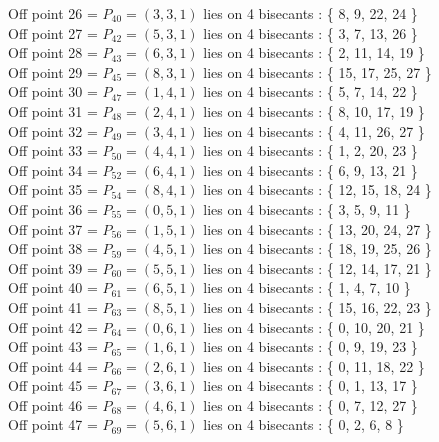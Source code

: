Off point 26 = $P_{40} = ( 3, 3, 1 )$ lies on 4 bisecants : \{ 8, 9, 22, 24 \}\\
Off point 27 = $P_{42} = ( 5, 3, 1 )$ lies on 4 bisecants : \{ 3, 7, 13, 26 \}\\
Off point 28 = $P_{43} = ( 6, 3, 1 )$ lies on 4 bisecants : \{ 2, 11, 14, 19 \}\\
Off point 29 = $P_{45} = ( 8, 3, 1 )$ lies on 4 bisecants : \{ 15, 17, 25, 27 \}\\
Off point 30 = $P_{47} = ( 1, 4, 1 )$ lies on 4 bisecants : \{ 5, 7, 14, 22 \}\\
Off point 31 = $P_{48} = ( 2, 4, 1 )$ lies on 4 bisecants : \{ 8, 10, 17, 19 \}\\
Off point 32 = $P_{49} = ( 3, 4, 1 )$ lies on 4 bisecants : \{ 4, 11, 26, 27 \}\\
Off point 33 = $P_{50} = ( 4, 4, 1 )$ lies on 4 bisecants : \{ 1, 2, 20, 23 \}\\
Off point 34 = $P_{52} = ( 6, 4, 1 )$ lies on 4 bisecants : \{ 6, 9, 13, 21 \}\\
Off point 35 = $P_{54} = ( 8, 4, 1 )$ lies on 4 bisecants : \{ 12, 15, 18, 24 \}\\
Off point 36 = $P_{55} = ( 0, 5, 1 )$ lies on 4 bisecants : \{ 3, 5, 9, 11 \}\\
Off point 37 = $P_{56} = ( 1, 5, 1 )$ lies on 4 bisecants : \{ 13, 20, 24, 27 \}\\
Off point 38 = $P_{59} = ( 4, 5, 1 )$ lies on 4 bisecants : \{ 18, 19, 25, 26 \}\\
Off point 39 = $P_{60} = ( 5, 5, 1 )$ lies on 4 bisecants : \{ 12, 14, 17, 21 \}\\
Off point 40 = $P_{61} = ( 6, 5, 1 )$ lies on 4 bisecants : \{ 1, 4, 7, 10 \}\\
Off point 41 = $P_{63} = ( 8, 5, 1 )$ lies on 4 bisecants : \{ 15, 16, 22, 23 \}\\
Off point 42 = $P_{64} = ( 0, 6, 1 )$ lies on 4 bisecants : \{ 0, 10, 20, 21 \}\\
Off point 43 = $P_{65} = ( 1, 6, 1 )$ lies on 4 bisecants : \{ 0, 9, 19, 23 \}\\
Off point 44 = $P_{66} = ( 2, 6, 1 )$ lies on 4 bisecants : \{ 0, 11, 18, 22 \}\\
Off point 45 = $P_{67} = ( 3, 6, 1 )$ lies on 4 bisecants : \{ 0, 1, 13, 17 \}\\
Off point 46 = $P_{68} = ( 4, 6, 1 )$ lies on 4 bisecants : \{ 0, 7, 12, 27 \}\\
Off point 47 = $P_{69} = ( 5, 6, 1 )$ lies on 4 bisecants : \{ 0, 2, 6, 8 \}\\
